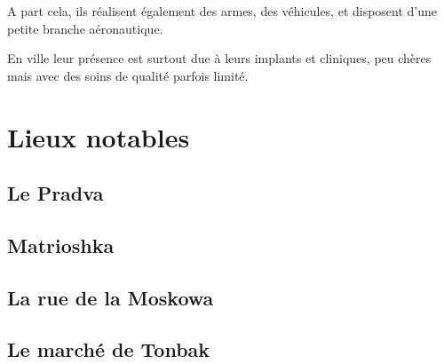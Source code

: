 \documentclass[10pt,a4paper]{book}
\begin{document}
A part cela, ils réalisent également des armes, des véhicules, et disposent d'une petite branche aéronautique.

En ville leur présence est surtout due à leurs implants et cliniques, peu chères mais avec des soins de qualité parfois limité.

\chapter{Lieux notables}
\section{Le Pradva}
\section{Matrioshka}
\section{La rue de la Moskowa}
\section{Le marché de Tonbak}
\end{document}
